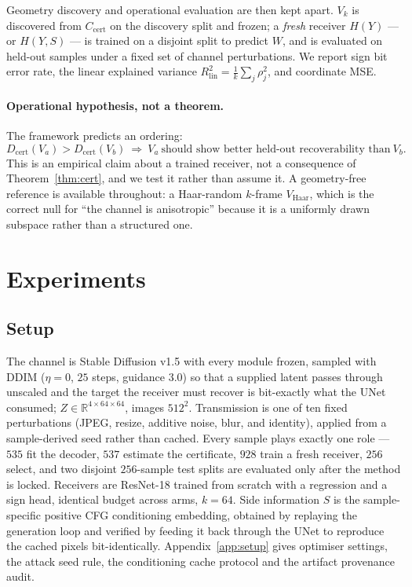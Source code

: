 \documentclass{article}
\theoremstyle{definition}
\newcommand{\Ccert}{C_{\mathrm{cert}}}
\newcommand{\Dcert}{D_{\mathrm{cert}}}
\begin{document}
Geometry discovery and operational evaluation are then kept apart. $V_k$ is discovered from
$\Ccert$ on the discovery split and frozen; a \emph{fresh} receiver $H(Y)$ --- or
$H(Y,S)$ --- is trained on a disjoint split to predict $W$, and is evaluated on held-out
samples under a fixed set of channel perturbations. We report sign bit error rate, the
linear explained variance $R^2_{\mathrm{lin}}=\frac1k\sum_j\rho_j^2$, and coordinate MSE.

\paragraph{Operational hypothesis, not a theorem.}
The framework predicts an ordering:
\begin{equation}
  \Dcert(V_a)>\Dcert(V_b)\ \Longrightarrow\ V_a\ \text{should show better held-out
  recoverability than}\ V_b .
  \label{eq:hypothesis}
\end{equation}
This is an empirical claim about a trained receiver, not a consequence of
Theorem~\ref{thm:cert}, and we test it rather than assume it. A geometry-free reference is
available throughout: a Haar-random $k$-frame $V_{\mathrm{Haar}}$, which is the correct
null for ``the channel is anisotropic'' because it is a uniformly drawn subspace rather
than a structured one.

\section{Experiments}

\subsection{Setup}
\label{sec:setup}

The channel is Stable Diffusion v1.5 with every module frozen, sampled with DDIM
($\eta=0$, $25$ steps, guidance $3.0$) so that a supplied latent passes through unscaled
and the target the receiver must recover is bit-exactly what the UNet consumed;
$Z\in\mathbb R^{4\times64\times64}$, images $512^2$. Transmission is one of ten fixed
perturbations (JPEG, resize, additive noise, blur, and identity), applied from a
sample-derived seed rather than cached. Every sample plays exactly one role --- $535$
fit the decoder, $537$ estimate the certificate, $928$ train a fresh receiver, $256$
select, and two disjoint $256$-sample test splits are evaluated only after the method is
locked. Receivers are ResNet-18 trained from scratch with a regression and a sign head,
identical budget across arms, $k=64$. Side information $S$ is the sample-specific positive
CFG conditioning embedding, obtained by replaying the generation loop and verified by
feeding it back through the UNet to reproduce the cached pixels bit-identically.
Appendix~\ref{app:setup} gives optimiser settings, the attack seed rule, the conditioning
cache protocol and the artifact provenance audit.
\end{document}
